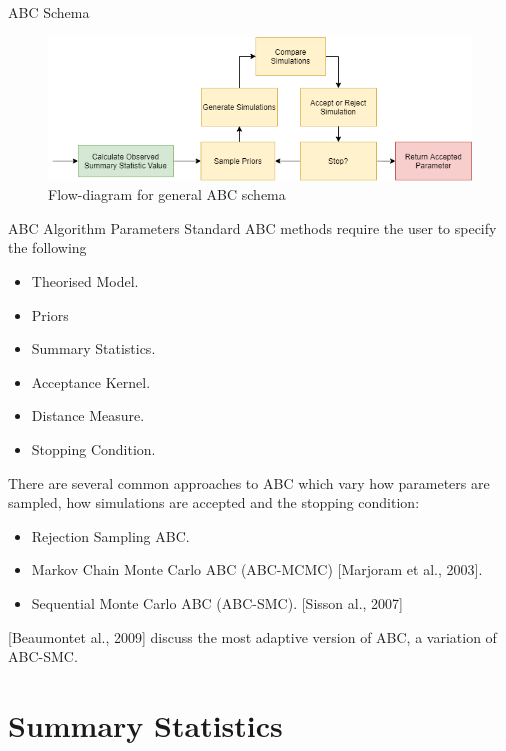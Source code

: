 \documentclass[aspectratio=169]{beamer}
\begin{document}
\begin{frame}{ABC Schema}
  \begin{figure}[H]
    \centering\includegraphics[width=1\textwidth]{ABC_flow.png}
    \caption{Flow-diagram for general ABC schema}
  \end{figure}
\end{frame}

\begin{frame}{ABC Algorithm Parameters}
  \setlength{\parskip}{.1\baselineskip}
  Standard ABC methods require the user to specify the following
  \begin{multicols}{2}
    \begin{itemize}
      \item Theorised Model.
      \item Priors
      \item Summary Statistics.
      \item Acceptance Kernel.
      \item Distance Measure.
      \item Stopping Condition.
    \end{itemize}
  \end{multicols}
  \par There are several common approaches to ABC which vary how parameters are sampled, how simulations are accepted and the stopping condition:
  \begin{itemize}
    \item Rejection Sampling ABC.
    \item Markov Chain Monte Carlo ABC (ABC-MCMC) [Marjoram et al., 2003].
    \item Sequential Monte Carlo ABC (ABC-SMC). [Sisson al., 2007]
  \end{itemize}
  [Beaumontet al., 2009] discuss the most adaptive version of ABC, a variation of ABC-SMC.
\end{frame}

\section{Summary Statistics}
\end{document}
